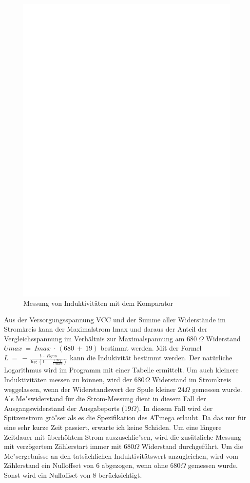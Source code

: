 \begin{figure}[H]
\centering
\includegraphics[]{../FIG/Inductance.eps}
\caption{Messung von Induktivit\"aten mit dem Komparator}
\label{fig:Inductance}
\end{figure}

Aus der Versorgungsspannung VCC und der Summe aller Widerst\"ande im Stromkreis kann der Maximalstrom Imax und
daraus der Anteil der Vergleichsspannung im Verh\"altnis zur Maximalspannung am \(680~\Omega\) Widerstand
\(Umax~=~Imax~\cdot~(680~+~19)\) bestimmt werden.
Mit der Formel \(L~=~-\frac{t~\cdot~Rges}{\log{(1~-~\frac{Uref}{Umax})}}\) kann die Indukivit\"at bestimmt werden.
Der nat\"urliche Logarithmus wird im Programm mit einer Tabelle ermittelt.
Um auch kleinere Induktivit\"aten messen zu k\"onnen, wird der \(680 \Omega\) Widerstand im Stromkreis weggelassen,
wenn der Widerstandswert der Spule kleiner \(24 \Omega\) gemessen wurde. Als Me"swiderstand f\"ur die Strom-Messung
dient in diesem Fall der Ausgangswiderstand der Ausgabeports (\(19 \Omega\)). In diesem Fall wird der Spitzenstrom gr\"o"ser
als es die Spezifikation des ATmega erlaubt. Da das nur f\"ur eine sehr kurze Zeit passiert, erwarte ich keine Sch\"aden.
Um eine l\"angere Zeitdauer mit \"uberh\"ohtem Strom auszuschlie"sen, wird die zus\"atzliche Messung mit 
verz\"ogertem Z\"ahlerstart immer mit \(680 \Omega\) Widerstand durchgef\"uhrt.
Um die Me"sergebnisse an den tats\"achlichen Induktivit\"atswert anzugleichen, wird vom Z\"ahlerstand ein
Nulloffset von 6 abgezogen, wenn ohne \(680 \Omega\) gemessen wurde. Sonst wird ein Nulloffset von 8 ber\"ucksichtigt.


